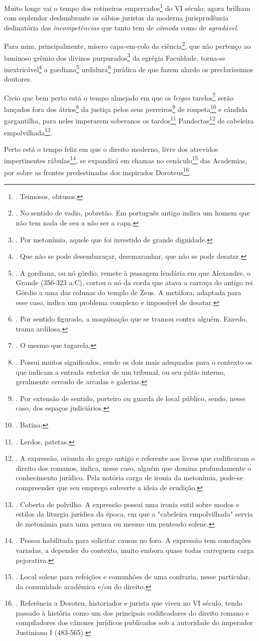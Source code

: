 Muito longe vai o tempo dos rotineiros emperrados\footnote{. Teimosos,
  obtusos.} do VI século; agora brilham com esplendor deslumbrante os
sábios juristas da moderna jurisprudência dedinatória das
\emph{incompetências} que tanto tem de \emph{cômoda} como de
\emph{agradável}.

Para mim, principalmente, mísero capa-em-colo da ciência\footnote{. No
  sentido de vadio, pobretão. Em português antigo indica um homem que
  não tem nada de seu a não ser a capa.}, que não pertenço ao luminoso
grêmio dos divinos purpurados\footnote{. Por metonímia, aquele que foi
  investido de grande dignidade.} da egrégia Faculdade, torna-se
inextricável\footnote{. Que não se pode desembaraçar, desemaranhar, que
  não se pode desatar.} a gordiana\footnote{. A gordiana, ou nó górdio,
  remete à passagem lendária em que Alexandre, o Grande (356-323 a.C),
  cortou o nó da corda que atava a carroça do antigo rei Górdio a uma
  das colunas do templo de Zeus. A metáfora, adaptada para esse caso,
  indica um problema complexo e impossível de desatar.}
urdidura\footnote{. Por sentido figurado, a maquinação que se tramou
  contra alguém. Enredo, trama ardilosa.} jurídica de que fazem alardo
os preclaríssimos doutores.

Creio que bem perto está o tempo almejado em que os \emph{leigos}
tarelos\footnote{. O mesmo que tagarela.} serão lançados fora dos
átrios\footnote{. Possui muitos significados, sendo os dois mais
  adequados para o contexto os que indicam a entrada exterior de um
  tribunal, ou seu pátio interno, geralmente cercado de arcadas e
  galerias.} da justiça pelos seus perreiros\footnote{. Por extensão de
  sentido, porteiro ou guarda de local público, sendo, nesse caso, dos
  espaços judiciários.} de roupeta\footnote{. Batina.} e cândida
gargantilha, para neles imperarem soberanos os tardos\footnote{. Lerdos,
  patetas.} Pandectas\footnote{. A expressão, oriunda do grego antigo e
  referente aos livros que codificaram o direito dos romanos, indica,
  nesse caso, alguém que domina profundamente o conhecimento jurídico.
  Pela notória carga de ironia da metonímia, pode-se compreender que seu
  emprego subverte a ideia de erudição.} de cabeleira
empolvilhada\footnote{. Coberta de polvilho. A expressão possui uma
  ironia sutil sobre modos e estilos da liturgia jurídica da época, em
  que a "cabeleira empolvilhada" servia de metonímia para uma peruca ou
  mesmo um penteado solene.}.

Perto está o tempo feliz em que o direito moderno, livre dos atrevidos
impertinentes rábulas\footnote{. Pessoa habilitada para solicitar causas
  no foro. A expressão tem conotações variadas, a depender do contexto,
  muito embora quase todas carreguem carga pejorativa.}, se expandirá em
chamas no cenáculo\footnote{. Local solene para refeições e comunhões de
  uma confraria, nesse particular, da comunidade acadêmica e/ou do
  direito.} das Academias, por sobre as frontes predestinadas dos
inspirados Doroteus\footnote{. Referência a Doroteu, historiador e
  jurista que viveu no VI século, tendo passado à história como um dos
  principais codificadores do direito romano e compiladores dos cânones
  jurídicos publicados sob a autoridade do imperador Justiniano I
  (483-565).}.

